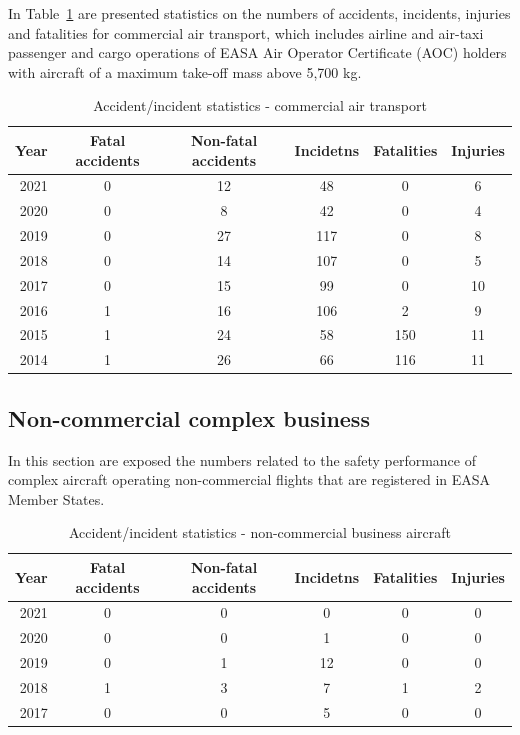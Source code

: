 \documentclass[
  11pt,
  a4paper,
]{book}
\begin{document}
In Table~\ref{tbl-statistics-commercial-aircraft} are presented
statistics on the numbers of accidents, incidents, injuries and
fatalities for commercial air transport, which includes airline and
air-taxi passenger and cargo operations of EASA Air Operator Certificate
(AOC) holders with aircraft of a maximum take-off mass above 5,700 kg.

\hypertarget{tbl-statistics-commercial-aircraft}{}
\begin{longtable}{rccccc}
\caption{\label{tbl-statistics-commercial-aircraft}Accident/incident statistics - commercial air transport }\tabularnewline

\toprule
Year & Fatal accidents & Non-fatal accidents & Incidetns & Fatalities & Injuries \\ 
\midrule
2021 & 0 & 12 & 48 & 0 & 6 \\ 
2020 & 0 & 8 & 42 & 0 & 4 \\ 
2019 & 0 & 27 & 117 & 0 & 8 \\ 
2018 & 0 & 14 & 107 & 0 & 5 \\ 
2017 & 0 & 15 & 99 & 0 & 10 \\ 
2016 & 1 & 16 & 106 & 2 & 9 \\ 
2015 & 1 & 24 & 58 & 150 & 11 \\ 
2014 & 1 & 26 & 66 & 116 & 11 \\ 
\bottomrule
\end{longtable}

\hypertarget{non-commercial-complex-business}{%
\subsection{Non-commercial complex
business}\label{non-commercial-complex-business}}

In this section are exposed the numbers related to the safety
performance of complex aircraft operating non-commercial flights that
are registered in EASA Member States.

\hypertarget{tbl-statistics-non-com-business}{}
\begin{longtable}{rccccc}
\caption{\label{tbl-statistics-non-com-business}Accident/incident statistics - non-commercial business aircraft }\tabularnewline

\toprule
Year & Fatal accidents & Non-fatal accidents & Incidetns & Fatalities & Injuries \\ 
\midrule
2021 & 0 & 0 & 0 & 0 & 0 \\ 
2020 & 0 & 0 & 1 & 0 & 0 \\ 
2019 & 0 & 1 & 12 & 0 & 0 \\ 
2018 & 1 & 3 & 7 & 1 & 2 \\ 
2017 & 0 & 0 & 5 & 0 & 0 \\ 
\bottomrule
\end{longtable}
\end{document}
